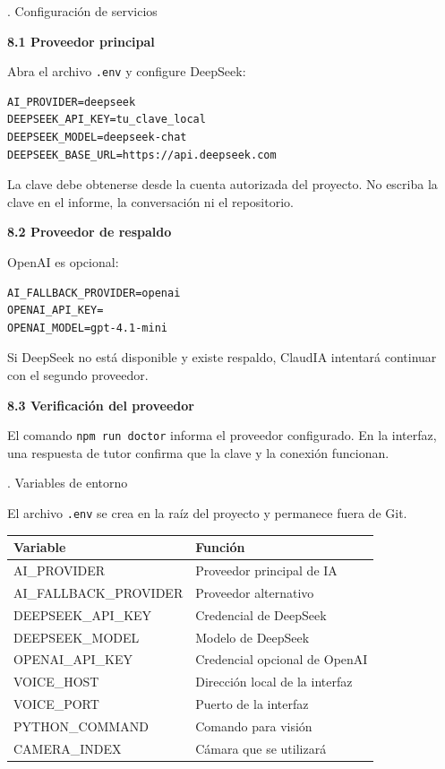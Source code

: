 \documentclass[11pt]{article}
\newcommand{\SectionNum}[2]{%
  \par\phantomsection\label{sec:#1}%
  {\normalfont\fontsize{14}{17}\selectfont #1. #2\par}%
  \vspace{7pt}%
}
\newcommand{\SubsectionNum}[2]{%
  \par\vspace{4pt}%
  {\normalfont\fontsize{12}{16.7}\selectfont\bfseries #1 #2\par}%
  \vspace{3pt}%
}
\begin{document}
\clearpage
\SectionNum{8}{Configuración de servicios}
\SubsectionNum{8.1}{Proveedor principal}
Abra el archivo \texttt{.env} y configure DeepSeek:
\begin{lstlisting}
AI_PROVIDER=deepseek
DEEPSEEK_API_KEY=tu_clave_local
DEEPSEEK_MODEL=deepseek-chat
DEEPSEEK_BASE_URL=https://api.deepseek.com
\end{lstlisting}
La clave debe obtenerse desde la cuenta autorizada del proyecto. No escriba la clave en el informe, la conversación ni el repositorio.

\SubsectionNum{8.2}{Proveedor de respaldo}
OpenAI es opcional:
\begin{lstlisting}
AI_FALLBACK_PROVIDER=openai
OPENAI_API_KEY=
OPENAI_MODEL=gpt-4.1-mini
\end{lstlisting}
Si DeepSeek no está disponible y existe respaldo, ClaudIA intentará continuar con el segundo proveedor.

\SubsectionNum{8.3}{Verificación del proveedor}
El comando \texttt{npm run doctor} informa el proveedor configurado. En la interfaz, una respuesta de tutor confirma que la clave y la conexión funcionan.

\clearpage
\SectionNum{9}{Variables de entorno}
El archivo \texttt{.env} se crea en la raíz del proyecto y permanece fuera de Git.

\begin{center}
\renewcommand{\arraystretch}{1.16}
\begin{tabularx}{\textwidth}{|>{\ttfamily}p{2.10in}|X|}
\hline
\rowcolor{tablehead}\normalfont\textbf{Variable} & \textbf{Función}\\
\hline
AI\_PROVIDER & Proveedor principal de IA\\
\hline
AI\_FALLBACK\_PROVIDER & Proveedor alternativo\\
\hline
DEEPSEEK\_API\_KEY & Credencial de DeepSeek\\
\hline
DEEPSEEK\_MODEL & Modelo de DeepSeek\\
\hline
OPENAI\_API\_KEY & Credencial opcional de OpenAI\\
\hline
VOICE\_HOST & Dirección local de la interfaz\\
\hline
VOICE\_PORT & Puerto de la interfaz\\
\hline
PYTHON\_COMMAND & Comando para visión\\
\hline
CAMERA\_INDEX & Cámara que se utilizará\\
\hline
\end{tabularx}
\end{center}
\end{document}
